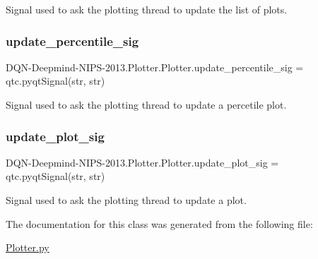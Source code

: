 Signal used to ask the plotting thread to update the list of plots. 

\hypertarget{classDQN-Deepmind-NIPS-2013_1_1Plotter_1_1Plotter_a4d72a490c71c0bb118e8c76a665a4908}{}\label{classDQN-Deepmind-NIPS-2013_1_1Plotter_1_1Plotter_a4d72a490c71c0bb118e8c76a665a4908} 
\subsubsection{\texorpdfstring{update\+\_\+percentile\+\_\+sig}{update\_percentile\_sig}}
{\footnotesize\ttfamily D\+QN-\/Deepmind-\/N\+I\+PS-\/2013.Plotter.\+Plotter.\+update\+\_\+percentile\+\_\+sig = qtc.\+pyqt\+Signal(str, str)\hspace{0.3cm}{\ttfamily [static]}}



Signal used to ask the plotting thread to update a percetile plot. 

\hypertarget{classDQN-Deepmind-NIPS-2013_1_1Plotter_1_1Plotter_af89689f9142da4126b9c256efa69bec6}{}\label{classDQN-Deepmind-NIPS-2013_1_1Plotter_1_1Plotter_af89689f9142da4126b9c256efa69bec6} 
\subsubsection{\texorpdfstring{update\+\_\+plot\+\_\+sig}{update\_plot\_sig}}
{\footnotesize\ttfamily D\+QN-\/Deepmind-\/N\+I\+PS-\/2013.Plotter.\+Plotter.\+update\+\_\+plot\+\_\+sig = qtc.\+pyqt\+Signal(str, str)\hspace{0.3cm}{\ttfamily [static]}}



Signal used to ask the plotting thread to update a plot. 



The documentation for this class was generated from the following file\+:\begin{DoxyCompactItemize}
\item 
\hyperlink{Plotter_8py}{Plotter.\+py}\end{DoxyCompactItemize}
